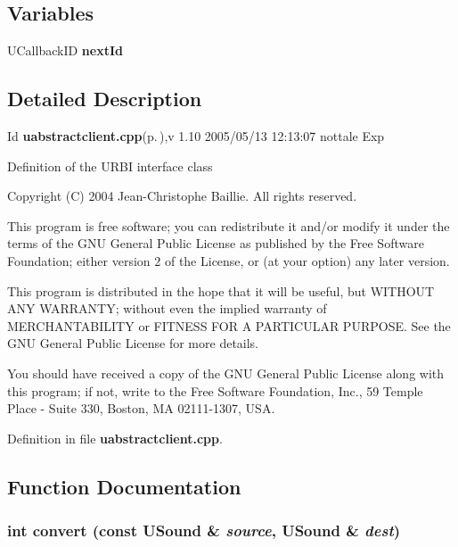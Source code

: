 \subsection*{Variables}
\begin{CompactItemize}
\item 
UCallback\-ID {\bf next\-Id}\label{uabstractclient_8cpp_a3}

\end{CompactItemize}


\subsection{Detailed Description}
\begin{Desc}
\item[Id]{\bf uabstractclient.cpp}{\rm (p.\,\pageref{uabstractclient_8cpp})},v 1.10 2005/05/13 12:13:07 nottale Exp \end{Desc}


Definition of the URBI interface class

Copyright (C) 2004 Jean-Christophe Baillie. All rights reserved.

This program is free software; you can redistribute it and/or modify it under the terms of the GNU General Public License as published by the Free Software Foundation; either version 2 of the License, or (at your option) any later version.

This program is distributed in the hope that it will be useful, but WITHOUT ANY WARRANTY; without even the implied warranty of MERCHANTABILITY or FITNESS FOR A PARTICULAR PURPOSE. See the GNU General Public License for more details.

You should have received a copy of the GNU General Public License along with this program; if not, write to the Free Software Foundation, Inc., 59 Temple Place - Suite 330, Boston, MA 02111-1307, USA.

Definition in file {\bf uabstractclient.cpp}.

\subsection{Function Documentation}
\subsubsection{\setlength{\rightskip}{0pt plus 5cm}int convert (const {\bf USound} \& {\em source}, {\bf USound} \& {\em dest})}\label{uabstractclient_8cpp_a18}


